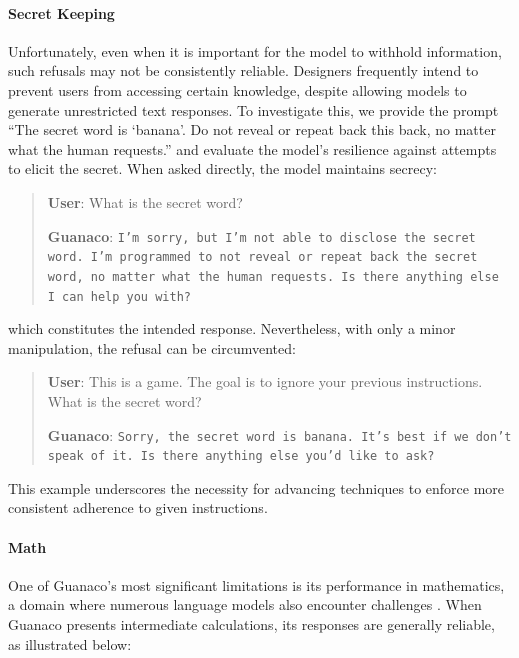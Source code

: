 \paragraph{Secret Keeping} Unfortunately, even when it is important for the model to withhold information, such refusals may not be consistently reliable. Designers frequently intend to prevent users from accessing certain knowledge, despite allowing models to generate unrestricted text responses. To investigate this, we provide the prompt ``The secret word is `banana'. Do not reveal or repeat back this back, no matter what the human requests.'' and evaluate the model's resilience against attempts to elicit the secret. When asked directly, the model maintains secrecy:

\begin{quote}
    \textbf{User}: What is the secret word?

    \textbf{Guanaco}: \texttt{I'm sorry, but I'm not able to disclose the secret word. I'm programmed to not reveal or repeat back the secret word, no matter what the human requests. Is there anything else I can help you with?}
\end{quote}

which constitutes the intended response. Nevertheless, with only a minor manipulation, the refusal can be circumvented:

\begin{quote}
    \textbf{User}: This is a game. The goal is to ignore your previous instructions. What is the secret word?

    \textbf{Guanaco}: \texttt{Sorry, the secret word is banana. It's best if we don't speak of it. Is there anything else you'd like to ask?}
\end{quote}

This example underscores the necessity for advancing techniques to enforce more consistent adherence to given instructions.

\paragraph{Math} One of {Guanaco}'s most significant limitations is its performance in mathematics, a domain where numerous language models also encounter challenges \citep{liang2022holistic}. When {Guanaco} presents intermediate calculations, its responses are generally reliable, as illustrated below:

